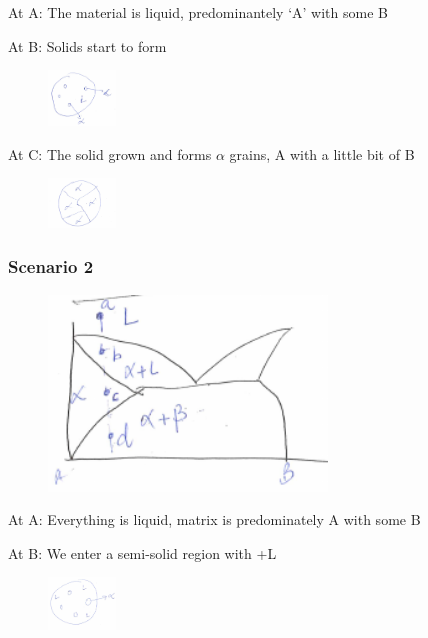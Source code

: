 \documentclass{article}
\begin{document}
At A: The material is liquid, predominantely `A' with some B

At B: Solids start to form
\begin{figure}[H]
	\centering
	\includegraphics[width=0.16\textwidth]{assets/cf5e3816.png}
\end{figure}

At C: The solid grown and forms $\alpha$ grains, A with a little bit of B
\begin{figure}[h!]
	\centering
	\includegraphics[width=0.16\textwidth]{assets/6a97b795.png}
\end{figure}

\subsubsection{Scenario 2}

\begin{figure}[h!]
	\centering
	\includegraphics[width=0.66\textwidth]{assets/6c779bcf.png}
\end{figure}

At A: Everything is liquid, matrix is predominately A with some B

At B: We enter a semi-solid region with \textalpha+L
\begin{figure}[h!]
	\centering
	\includegraphics[width=0.16\textwidth]{assets/da3df784.png}
\end{figure}
\end{document}
